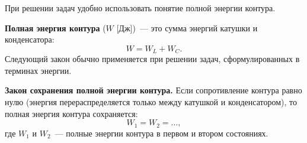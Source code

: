 \documentclass[main.tex]{subfiles}
\begin{document}
При решении задач удобно использовать понятие полной энергии контура.

\textbf{Полная энергия контура} ($W$ [Дж])~--- это сумма энергий катушки и конденсатора:
\begin{equation}
    W=W_L+W_C.
\end{equation}
%
%
Следующий закон обычно применяется при решении задач, сформулированных в терминах энергии.
%
\begin{law}
    \textbf{Закон сохранения полной энергии контура.} Если сопротивление контура равно нулю (энергия перераспределяется только между катушкой и конденсатором), то полная энергия контура сохраняется:
    \begin{equation}
        W_1=W_2=\ldots,
    \end{equation}
    где $W_1$ и $W_2$~--- полные энергии контура в первом и втором состояниях. 
\end{law}




 
\end{document}
